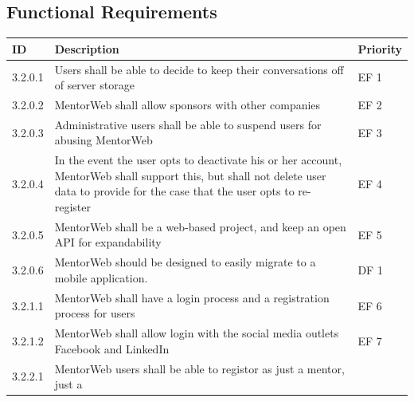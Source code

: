 \documentclass[11pt]{article}
\begin{document}
    \subsection{Functional Requirements}
    \begin{center}
    \begin{longtable}{|l|p{8 cm}|l|}
        \hline
        ID      & Description                             & Priority \\ \hline
        3.2.0.1 & Users shall be able to decide to keep
                  their conversations\index{Conversation}
                  off of server storage                   & EF 1  \\ \hline
        3.2.0.2 & MentorWeb shall allow
                  sponsors\index{Sponsor} with other
                  companies                               & EF 2  \\ \hline
        3.2.0.3 & Administrative users shall be able to
                  suspend users for abusing
                  MentorWeb\index{MentorWeb}              & EF 3  \\ \hline
        3.2.0.4 & In the event the user opts to deactivate
                  his or her account,
                  MentorWeb\index{MentorWeb} shall
                  support this, but shall not delete user
                  data to provide for the case that the
                  user opts to re-register                & EF 4  \\ \hline
        3.2.0.5 & MentorWeb\index{MentorWeb} shall be a
                  web-based project, and keep an open API
                  for expandability                       & EF 5  \\ \hline
                  3.2.0.6 & MentorWeb\index{MentorWeb}
                  should be designed to easily migrate to
                  a mobile application.                   & DF 1  \\ \hline
        3.2.1.1 & MentorWeb\index{MentorWeb} shall have a
                  login process and a registration process
                  for users                               & EF 6  \\ \hline
        3.2.1.2 & MentorWeb\index{MentorWeb} shall allow
                  login with the social media outlets
                  Facebook\index{Facebook} and
                  LinkedIn\index{LinkedIn}                & EF 7  \\ \hline
        3.2.2.1 & MentorWeb\index{MentorWeb} users shall
                  be able to registor as just a
                  mentor\index{Mentor}, just a

\end{longtable}
\end{center}
\end{document}

